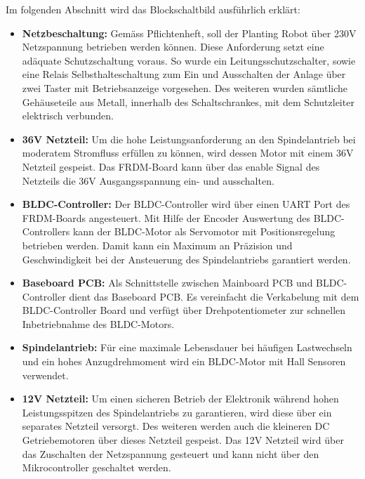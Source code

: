 Im folgenden Abschnitt wird das Blockschaltbild ausführlich erklärt:
\begin{itemize}
	\item \textbf{Netzbeschaltung:} Gemäss Pflichtenheft, soll der Planting Robot über 230V Netzspannung betrieben werden können. Diese Anforderung setzt eine adäquate Schutzschaltung voraus. So wurde ein Leitungsschutzschalter, sowie eine Relais Selbsthalteschaltung zum Ein und Ausschalten der Anlage über zwei Taster mit Betriebsanzeige vorgesehen. Des weiteren wurden sämtliche Gehäuseteile aus Metall, innerhalb des Schaltschrankes, mit dem Schutzleiter elektrisch verbunden.

	\item \textbf{36V Netzteil:} Um die hohe Leistungsanforderung an den Spindelantrieb bei moderatem Stromfluss erfüllen zu können, wird dessen Motor mit einem 36V Netzteil gespeist. Das FRDM-Board kann über das enable Signal des Netzteils die 36V Ausgangsspannung ein- und ausschalten.
	
	\item \textbf{BLDC-Controller:} Der BLDC-Controller wird über einen UART Port des FRDM-Boards angesteuert. Mit Hilfe der Encoder Auswertung des BLDC-Controllers kann der BLDC-Motor als Servomotor mit Positionsregelung betrieben werden. Damit kann ein Maximum an Präzision und Geschwindigkeit bei der Ansteuerung des Spindelantriebs garantiert werden.
	
	\item \textbf{Baseboard PCB:} Als Schnittstelle zwischen Mainboard PCB und BLDC-Controller dient das Baseboard PCB. Es vereinfacht die Verkabelung mit dem BLDC-Controller Board und verfügt über Drehpotentiometer zur schnellen Inbetriebnahme des BLDC-Motors.
	
	\item \textbf{Spindelantrieb:} Für eine maximale Lebensdauer bei häufigen Lastwechseln und ein hohes Anzugdrehmoment wird ein BLDC-Motor mit Hall Sensoren verwendet.
			
	\item \textbf{12V Netzteil:} Um einen sicheren Betrieb der Elektronik während hohen Leistungsspitzen des Spindelantriebs zu garantieren, wird diese über ein separates Netzteil versorgt. Des weiteren werden auch die kleineren DC Getriebemotoren über dieses Netzteil gespeist. Das 12V Netzteil wird über das Zuschalten der Netzspannung gesteuert und kann nicht über den Mikrocontroller geschaltet werden.
\end{itemize}